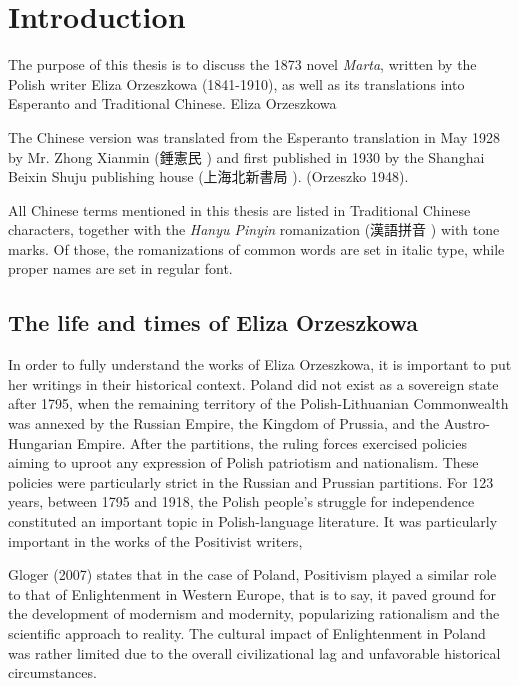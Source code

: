 \chapter{Introduction}

The purpose of this thesis is to discuss the 1873 novel \textit{Marta}, written by the Polish writer Eliza Orzeszkowa (1841-1910), as well as its translations into Esperanto and Traditional Chinese.
Eliza Orzeszkowa 

The Chinese version was translated from the Esperanto translation in May 1928 by Mr. Zhong Xianmin (錘憲民 ) and first published in 1930 by the Shanghai Beixin Shuju publishing house (上海北新書局 ).
(Orzeszko 1948).

All Chinese terms mentioned in this thesis are listed in Traditional Chinese characters, together with the \textit{Hanyu Pinyin} romanization (漢語拼音 ) with tone marks. Of those, the romanizations of common words are set in italic type, while proper names are set in regular font.

\section{The life and times of Eliza Orzeszkowa}

In order to fully understand the works of Eliza Orzeszkowa, it is important to put her writings in their historical context.
Poland did not exist as a sovereign state after 1795, when the remaining territory of the Polish-Lithuanian Commonwealth was annexed by the Russian Empire, the  Kingdom of Prussia, and the Austro-Hungarian Empire.
After the partitions, the ruling forces exercised policies aiming to uproot any expression of Polish patriotism and nationalism. These policies were particularly strict in the Russian and Prussian partitions.
For 123 years, between 1795 and 1918, the Polish people's struggle for independence constituted an important topic in Polish-language literature.
It was particularly important in the works of the Positivist writers, 

Gloger (2007) states that in the case of Poland, Positivism played a similar role to that of Enlightenment in Western Europe, that is to say, it paved ground for the development of modernism and modernity, popularizing rationalism and the scientific approach to reality. The cultural impact of Enlightenment in Poland was rather limited due to the overall civilizational lag and unfavorable historical circumstances.

